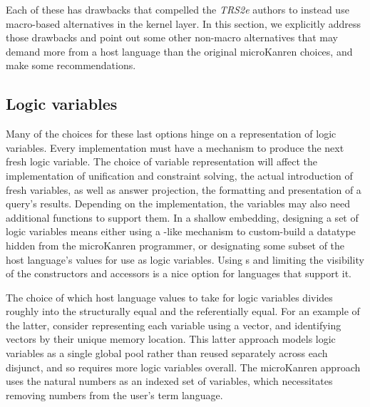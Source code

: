 \documentclass[sigplan,balance=true,pbalance=true,natbib=false]{acmart}
\begin{document}
Each of these has drawbacks that compelled the \emph{TRS2e} authors to
instead use macro-based alternatives in the kernel layer. In this
section, we explicitly address those drawbacks and point out some
other non-macro alternatives that may demand more from a host language
than the original microKanren choices, and make some recommendations.

\subsection{Logic variables}

Many of the choices for these last options hinge on a representation
of logic variables. Every implementation must have a mechanism to
produce the next fresh logic variable. The choice of variable
representation will affect the implementation of unification and
constraint solving, the actual introduction of fresh variables, as
well as answer projection, the formatting and presentation of a
query's results. Depending on the implementation, the variables may
also need additional functions to support them. In a shallow
embedding, designing a set of logic variables means either using a
-like mechanism to custom-build a datatype hidden
from the microKanren programmer, or designating some subset of the
host language's values for use as logic variables. Using
s and limiting the visibility of the constructors
and accessors is a nice option for languages that support it.

The choice of which host language values to take for logic variables
divides roughly into the structurally equal and the referentially
equal. For an example of the latter, consider representing each
variable using a vector, and identifying vectors by their unique
memory location. This latter approach models logic variables as a
single global pool rather than reused separately across each disjunct,
and so requires more logic variables overall. The microKanren approach
uses the natural numbers as an indexed set of variables, which
necessitates removing numbers from the user's term language.

\subsection{}
\end{document}
